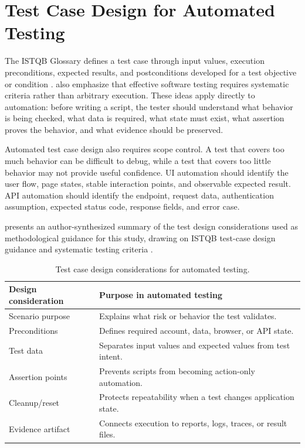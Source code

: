 \section{Test Case Design for Automated Testing}
\label{sec:ch2-test-case-design}

The ISTQB Glossary defines a test case through input values, execution preconditions, expected results, and postconditions developed for a test objective or condition \autocite{istqb_glossary_test_case_2026}. \textcite{ammann_offutt_testing_2016} also emphasize that effective software testing requires systematic criteria rather than arbitrary execution. These ideas apply directly to automation: before writing a script, the tester should understand what behavior is being checked, what data is required, what state must exist, what assertion proves the behavior, and what evidence should be preserved.

Automated test case design also requires scope control. A test that covers too much behavior can be difficult to debug, while a test that covers too little behavior may not provide useful confidence. UI automation should identify the user flow, page states, stable interaction points, and observable expected result. API automation should identify the endpoint, request data, authentication assumption, expected status code, response fields, and error case.

 presents an author-synthesized summary of the test design considerations used as methodological guidance for this study, drawing on ISTQB test-case design guidance \autocite{istqb_glossary_test_case_2026} and systematic testing criteria \autocite{ammann_offutt_testing_2016}.

\begin{table}[htbp]
  \centering
  \tablefont
  \begin{tabularx}{\textwidth}{YY}
    \toprule
    Design consideration & Purpose in automated testing \\
    \midrule
    Scenario purpose & Explains what risk or behavior the test validates. \\
    Preconditions & Defines required account, data, browser, or API state. \\
    Test data & Separates input values and expected values from test intent. \\
    Assertion points & Prevents scripts from becoming action-only automation. \\
    Cleanup/reset & Protects repeatability when a test changes application state. \\
    Evidence artifact & Connects execution to reports, logs, traces, or result files. \\
    \bottomrule
  \end{tabularx}
  \caption{Test case design considerations for automated testing.}
  \label{tab:automated-test-design-considerations}
\end{table}

